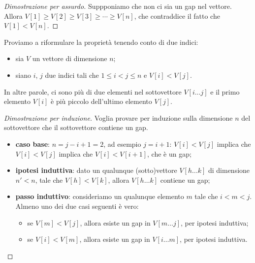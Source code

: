 \begin{proof}[Dimostrazione per assurdo]
Suppponiamo che non ci sia un gap nel vettore.
Allora \(V[1] \geqslant V[2] \geqslant V[3] \geqslant \dotsm \geqslant V[n]\), che contraddice il fatto che \(V[1] < V[n]\).
\end{proof}

Proviamo a riformulare la proprietà tenendo conto di due indici:
\begin{itemize}
	\item sia \(V\) un vettore di dimensione \(n\);
	\item siano \(i\), \(j\) due indici tali che \(1 \leqslant i < j \leqslant n\) e \(V[i] < V[j]\).
\end{itemize}
In altre parole, ci sono più di due elementi nel sottovettore \(V[i \dots j]\) e il primo elemento \(V[i]\) è più piccolo dell'ultimo elemento \(V[j]\).

\begin{proof}[Dimostrazione per induzione]
Voglia provare per induzione sulla dimensione \(n\) del sottovettore che il sottovettore contiene un gap.
\begin{itemize}
	\item \textbf{caso base}: \(n = j - i + 1 = 2\), ad esempio \(j = i + 1\): \(V[i] < V[j]\) implica che \(V[i] < V[j]\) implica che \(V[i] < V[i + 1]\), che è un gap;

	\item \textbf{ipotesi induttiva}: dato un qualunque (sotto)vettore \(V[h \dots k]\) di dimensione \(n' < n\), tale che \(V[h] < V[k]\), allora \(V[h \dots k]\) contiene un gap;

	\item \textbf{passo induttivo}: consideriamo un qualunque elemento \(m\) tale che \(i < m < j\).
	Almeno uno dei due casi seguenti è vero:
	\begin{itemize}
		\item se \(V[m] < V[j]\), allora esiste un gap in \(V[m \dots j]\), per ipotesi induttiva;
		\item se \(V[i] < V[m]\), allora esiste un gap in \(V[i \dots m]\), per ipotesi induttiva.
	\end{itemize}
\end{itemize}
\end{proof}

